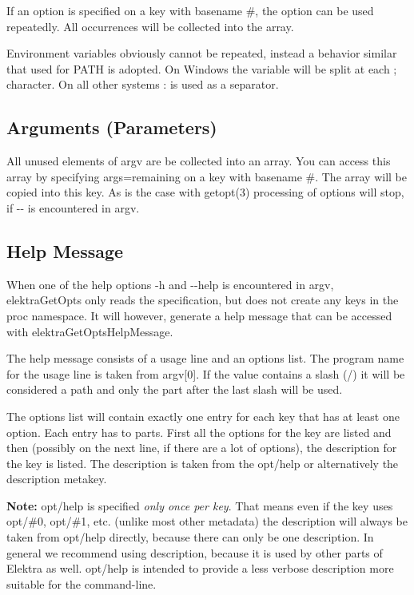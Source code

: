 If an option is specified on a key with basename {\ttfamily \#}, the option can be used repeatedly. All occurrences will be collected into the array.

Environment variables obviously cannot be repeated, instead a behavior similar that used for P\+A\+TH is adopted. On Windows the variable will be split at each \textquotesingle{};\textquotesingle{} character. On all other systems \textquotesingle{}\+:\textquotesingle{} is used as a separator.

\subsection*{Arguments (Parameters)}

All unused elements of {\ttfamily argv} are be collected into an array. You can access this array by specifying {\ttfamily args=remaining} on a key with basename {\ttfamily \#}. The array will be copied into this key. As is the case with getopt(3) processing of options will stop, if {\ttfamily -\/-\/} is encountered in {\ttfamily argv}.

\subsection*{Help Message}

When one of the help options {\ttfamily -\/h} and {\ttfamily -\/-\/help} is encountered in {\ttfamily argv}, {\ttfamily elektra\+Get\+Opts} only reads the specification, but does not create any keys in the {\ttfamily proc} namespace. It will however, generate a help message that can be accessed with {\ttfamily elektra\+Get\+Opts\+Help\+Message}.

The help message consists of a usage line and an options list. The program name for the usage line is taken from {\ttfamily argv\mbox{[}0\mbox{]}}. If the value contains a slash ({\ttfamily /}) it will be considered a path and only the part after the last slash will be used.

The options list will contain exactly one entry for each key that has at least one option. Each entry has to parts. First all the options for the key are listed and then (possibly on the next line, if there are a lot of options), the description for the key is listed. The description is taken from the {\ttfamily opt/help} or alternatively the {\ttfamily description} metakey.

{\bfseries Note\+:} {\ttfamily opt/help} is specified {\itshape only once per key}. That means even if the key uses {\ttfamily opt/\#0}, {\ttfamily opt/\#1}, etc. (unlike most other metadata) the description will always be taken from {\ttfamily opt/help} directly, because there can only be one description. In general we recommend using {\ttfamily description}, because it is used by other parts of Elektra as well. {\ttfamily opt/help} is intended to provide a less verbose description more suitable for the command-\/line.

